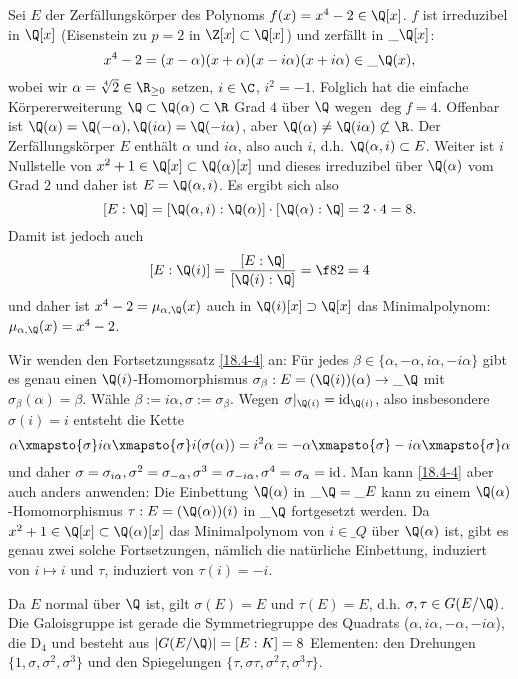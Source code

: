 \begin{ex} \label{19.5-5}
	Sei $E$ der Zerfällungskörper des Polynoms $f(x) = x^4 - 2 \in \Q[x]$.
	$f$ ist irreduzibel in $\Q[x]$ (Eisenstein zu $p = 2$ in $\Z[x] \subset \Q[x]$) und zerfällt in $\_\Q[x]$:
	\[
		x^4 - 2
		= (x-\alpha)(x + \alpha)(x - i\alpha)(x + i \alpha)
		\in \_\Q(x),
	\]
	wobei wir $\alpha = \sqrt[4]{2} \in \R_{\ge 0}$ setzen, $i \in \C$, $i^2 = -1$.
	Folglich hat die einfache Körpererweiterung $\Q \subset \Q(\alpha) \subset \R$ Grad $4$ über $\Q$ wegen $\deg f = 4$.
	Offenbar ist $\Q(\alpha) = \Q(-\alpha), \Q(i\alpha) = \Q(-i\alpha)$, aber $\Q(\alpha) \neq \Q(i\alpha) \not\subset \R$.
	Der Zerfällungskörper $E$ enthält $\alpha$ und $i \alpha$, also auch $i$, d.h. $\Q(\alpha, i) \subset E$.
	Weiter ist $i$ Nullstelle von $x^2 + 1 \in \Q[x] \subset \Q(\alpha)[x]$ und dieses irreduzibel über $\Q(\alpha)$ vom Grad $2$ und daher ist $E = \Q(\alpha, i)$.
	Es ergibt sich also
	\[
		[E : \Q] = [\Q(\alpha, i) : \Q(\alpha)] \cdot [\Q(\alpha) : \Q] = 2 \cdot 4 = 8.
	\]
	Damit ist jedoch auch
	\[
		[E : \Q(i)] = \dfrac{[E : \Q]}{[\Q(i) : \Q]} = \f 82 = 4
	\]
	und daher ist $x^4 - 2 = \mu_{\alpha, \Q}(x)$ auch in $\Q(i)[x] \supset \Q[x]$ das Minimalpolynom: $\mu_{\alpha, \Q}(x) = x^4 - 2$.

	Wir wenden den Fortsetzungssatz \ref{18.4-4} an:
	Für jedes $\beta \in \{\alpha, -\alpha, i \alpha, -i \alpha\}$ gibt es genau einen $\Q(i)$-Homomorphismus $\sigma_\beta: E = (\Q(i))(\alpha) \to \_{\Q}$ mit $\sigma_\beta(\alpha) = \beta$.
	Wähle $\beta := i \alpha, \sigma := \sigma_\beta$.
	Wegen $\sigma|_{\Q(i)} = \id_{\Q(i)}$, also insbesondere $\sigma(i) = i$ entsteht die Kette
	\[
		\alpha
		\xmapsto{\sigma} i\alpha
		\xmapsto{\sigma} i(\sigma(\alpha)) = i^2 \alpha = -\alpha
		\xmapsto{\sigma} -i\alpha
		\xmapsto{\sigma} \alpha
	\]
	und daher $\sigma = \sigma_{i\alpha}, \sigma^2 = \sigma_{-\alpha}, \sigma^3 = \sigma_{-i\alpha}, \sigma^4 = \sigma_\alpha = \operatorname{id}$.
	Man kann \ref{18.4-4} aber auch anders anwenden:
	Die Einbettung $\Q(\alpha)$ in $\_\Q = \_E$ kann zu einem $\Q(\alpha)$-Homomorphismus $\tau: E = (\Q(\alpha))(i)$ in $\_\Q$ fortgesetzt werden.
	Da $x^2 + 1 \in \Q[x] \subset \Q(\alpha)[x]$ das Minimalpolynom von $i \in \_Q$ über $\Q(\alpha)$ ist, gibt es genau zwei solche Fortsetzungen, nämlich die natürliche Einbettung, induziert von $i \mapsto i$ und $\tau$, induziert von $\tau(i) = -i$.

	Da $E$ normal über $\Q$ ist, gilt $\sigma(E) = E$ und $\tau(E) = E$, d.h. $\sigma, \tau \in G(E / \Q)$.
	Die Galoisgruppe ist gerade die Symmetriegruppe des Quadrats ($\alpha, i\alpha, -\alpha, -i\alpha$), die  $\mathrm D_4$ und besteht aus $|G(E / \Q)| = [E : K] = 8$ Elementen: den Drehungen $\{1, \sigma, \sigma^2, \sigma^3\}$ und den Spiegelungen $\{\tau, \sigma\tau, \sigma^2\tau, \sigma^3\tau\}$.


\end{ex}

